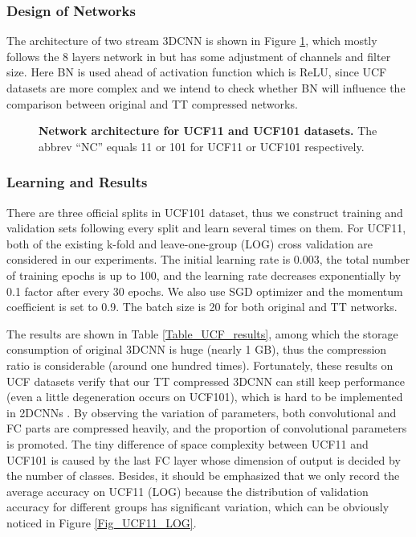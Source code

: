 \documentclass[a4paper,fleqn]{cas-dc}
\begin{document}
\subsubsection{Design of Networks}\quad

The architecture of two stream 3DCNN is shown in Figure \ref{Fig_UCF_3DCNNs}, which mostly follows the 8 layers network in \citet{Varol_2018_LongTerm3DCNN} but has some adjustment of channels and filter size. Here BN is used ahead of activation function which is ReLU, since UCF datasets are more complex and we intend to check whether BN will influence the comparison between original and TT compressed networks.

\begin{figure}
\centering
{}
\caption{\textbf{Network architecture for UCF11 and UCF101 datasets.} The abbrev ``NC'' equals 11 or 101 for UCF11 or UCF101 respectively.}
\label{Fig_UCF_3DCNNs}
\end{figure}

\subsubsection{Learning and Results}\quad

There are three official splits in UCF101 dataset, thus we construct training and validation sets following every split and learn several times on them. For UCF11, both of the existing k-fold \citep{Yang_2017_TTRNN} and leave-one-group (LOG) \citep{Peng_2014_UCF11} cross validation are considered in our experiments. The initial learning rate is 0.003, the total number of training epochs is up to 100, and the learning rate decreases exponentially by 0.1 factor after every 30 epochs. We also use SGD optimizer and the momentum coefficient is set to 0.9. The batch size is 20 for both original and TT networks.

The results are shown in Table \ref{Table_UCF_results}, among which the storage consumption of original 3DCNN is huge (nearly 1 GB), thus the compression ratio is considerable (around one hundred times). Fortunately, these results on UCF datasets verify that our TT compressed 3DCNN can still keep performance (even a little degeneration occurs on UCF101), which is hard to be implemented in 2DCNNs \citep{Garipov_2016_TTCNN}. By observing the variation of parameters, both convolutional and FC parts are compressed heavily, and the proportion of convolutional parameters is promoted. The tiny difference of space complexity between UCF11 and UCF101 is caused by the last FC layer whose dimension of output is decided by the number of classes. Besides, it should be emphasized that we only record the average accuracy on UCF11 (LOG) because the distribution of validation accuracy for different groups has significant variation, which can be obviously noticed in Figure \ref{Fig_UCF11_LOG}.
\end{document}
